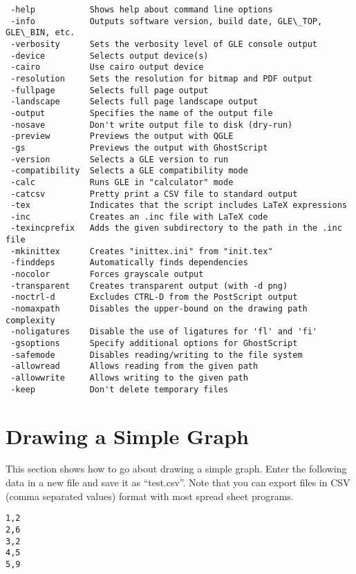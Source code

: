\preglecode{}
\begin{Verbatim}
 -help           Shows help about command line options
 -info           Outputs software version, build date, GLE\_TOP, GLE\_BIN, etc.
 -verbosity      Sets the verbosity level of GLE console output
 -device         Selects output device(s)
 -cairo          Use cairo output device
 -resolution     Sets the resolution for bitmap and PDF output
 -fullpage       Selects full page output
 -landscape      Selects full page landscape output
 -output         Specifies the name of the output file
 -nosave         Don't write output file to disk (dry-run)
 -preview        Previews the output with QGLE
 -gs             Previews the output with GhostScript
 -version        Selects a GLE version to run
 -compatibility  Selects a GLE compatibility mode
 -calc           Runs GLE in "calculator" mode
 -catcsv         Pretty print a CSV file to standard output
 -tex            Indicates that the script includes LaTeX expressions
 -inc            Creates an .inc file with LaTeX code
 -texincprefix   Adds the given subdirectory to the path in the .inc file
 -mkinittex      Creates "inittex.ini" from "init.tex"
 -finddeps       Automatically finds dependencies
 -nocolor        Forces grayscale output
 -transparent    Creates transparent output (with -d png)
 -noctrl-d       Excludes CTRL-D from the PostScript output
 -nomaxpath      Disables the upper-bound on the drawing path complexity
 -noligatures    Disable the use of ligatures for 'fl' and 'fi'
 -gsoptions      Specify additional options for GhostScript
 -safemode       Disables reading/writing to the file system
 -allowread      Allows reading from the given path
 -allowwrite     Allows writing to the given path
 -keep           Don't delete temporary files
\end{Verbatim}
\postglecode{}

\section{Drawing a Simple Graph}

This section shows how to go about drawing a simple graph. Enter the following data in a new file and save it as ``test.csv''. Note that you can export files in CSV (comma separated values) format with most spread sheet programs.

\preglecode{}
\begin{Verbatim}
1,2
2,6
3,2
4,5
5,9
\end{Verbatim}
\postglecode{}

